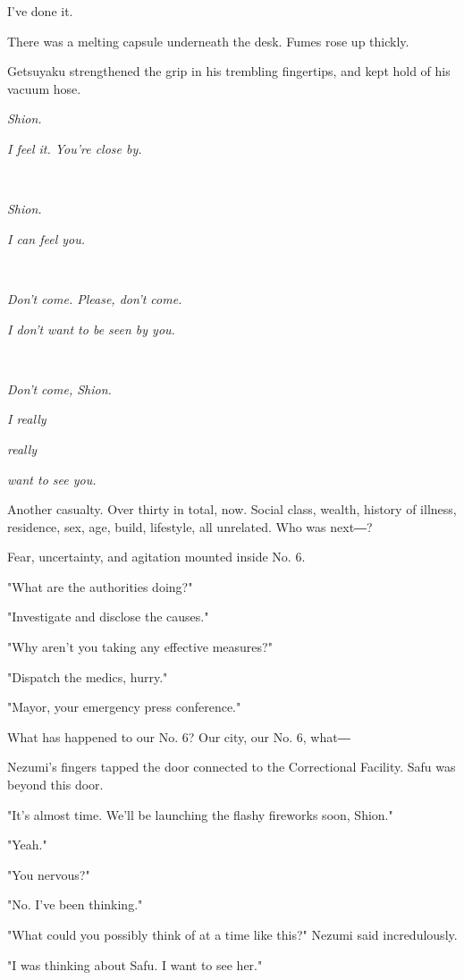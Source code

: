 I've done it.

There was a melting capsule underneath the desk. Fumes rose up thickly.

Getsuyaku strengthened the grip in his trembling fingertips, and kept
hold of his vacuum hose.

\emph{Shion.}

\emph{I feel it. You're close by.}

\emph{\\
}

\emph{Shion.}

\emph{I can feel you.}

\emph{\\
}

\emph{Don't come. Please, don't come.}

\emph{I don't want to be seen by you.}

\emph{\\
}

\emph{Don't come, Shion.}

\emph{I really}

\emph{really}

\emph{want to see you.}

Another casualty. Over thirty in total, now. Social class, wealth,
history of illness, residence, sex, age, build, lifestyle, all
unrelated. Who was next―?

Fear, uncertainty, and agitation mounted inside No. 6.

"What are the authorities doing?"

"Investigate and disclose the causes."

"Why aren't you taking any effective measures?"

"Dispatch the medics, hurry."

"Mayor, your emergency press conference."

What has happened to our No. 6? Our city, our No. 6, what―

Nezumi's fingers tapped the door connected to the Correctional Facility.
Safu was beyond this door.

"It's almost time. We'll be launching the flashy fireworks soon, Shion."

"Yeah."

"You nervous?"

"No. I've been thinking."

"What could you possibly think of at a time like this?" Nezumi said
incredulously.

"I was thinking about Safu. I want to see her."

